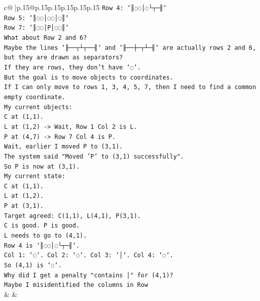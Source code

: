 \documentclass{article}
\begin{document}
{\begin{supertabular}{c@{$\;$}|p{.15\linewidth}@{}p{.15\linewidth}p{.15\linewidth}p{.15\linewidth}p{.15\linewidth}p{.15\linewidth}}
{{{\texttt{Row 4: `║◌◌│◌└┬─╢`} \\
\texttt{Row 5: `║◌◌│◌◌│◌║`} \\
\texttt{Row 7: `║◌◌│P│◌◌║`} \\
\texttt{What about Row 2 and 6?} \\
\texttt{Maybe the lines `╟──┬┴┬──╢` and `╟──┼─┬┴─╢` are actually rows 2 and 6, but they are drawn as separators?} \\
\texttt{If they are rows, they don't have `◌`.} \\
\texttt{But the goal is to move objects to coordinates.} \\
\texttt{If I can only move to rows 1, 3, 4, 5, 7, then I need to find a common empty coordinate.} \\
\texttt{My current objects:} \\
\texttt{C at (1,1).} \\
\texttt{L at (1,2) {-}> Wait, Row 1 Col 2 is L.} \\
\texttt{P at (4,7) {-}> Row 7 Col 4 is P.} \\
\texttt{Wait, earlier I moved P to (3,1).} \\
\texttt{The system said "Moved 'P' to (3,1) successfully".} \\
\texttt{So P is now at (3,1).} \\
\texttt{My current state:} \\
\texttt{C at (1,1).} \\
\texttt{L at (1,2).} \\
\texttt{P at (3,1).} \\
\texttt{Target agreed: C(1,1), L(4,1), P(3,1).} \\
\texttt{C is good. P is good.} \\
\texttt{L needs to go to (4,1).} \\
\texttt{Row 4 is `║◌◌│◌└┬─╢`.} \\
\texttt{Col 1: `◌`. Col 2: `◌`. Col 3: `│`. Col 4: `◌`.} \\
\texttt{So (4,1) is `◌`.} \\
\texttt{Why did I get a penalty "contains │" for (4,1)?} \\
\texttt{Maybe I misidentified the columns in Row} \\
            }
        }
    }
    & & \\ \\


\end{supertabular}}
\end{document}
